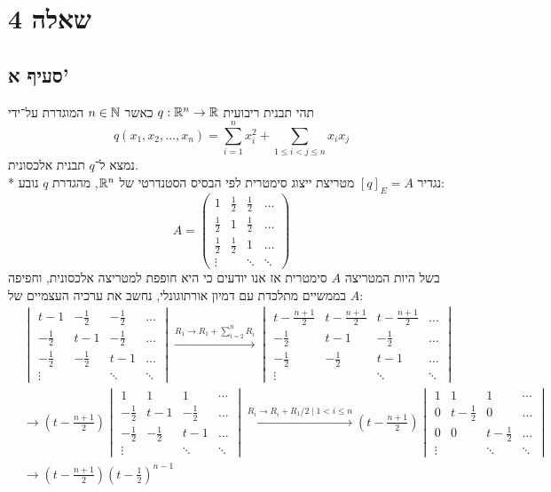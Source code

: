 \section{שאלה 4}
\subsection{סעיף א'}
תהי תבנית ריבועית $q: \mathbb{R}^n \to \mathbb{R}$ כאשר $n \in \mathbb{N}$ המוגדרת על־ידי
\[
	q(x_1, x_2, \ldots, x_n) = \sum_{i = 1}^n x_i^2 + \sum_{1 \le i < j \le n} x_i x_j
\]
נמצא ל־$q$ תבנית אלכסונית. \\*
נגדיר $[q]_E = A$ מטריצת ייצוג סימטרית לפי הבסיס הסטנדרטי של $\mathbb{R}^n$, מהגדרת $q$ נובע:
\[
	A = \begin{pmatrix}
		1  & \frac{1}{2} & \frac{1}{2} & \hdots \\
		\frac{1}{2} & 1 & \frac{1}{2} & \hdots \\
		\frac{1}{2} & \frac{1}{2} & 1 & \hdots \\
		\vdots & & \ddots & \ddots
	\end{pmatrix}
\]
בשל היות המטריצה $A$ סימטרית אז אנו יודעים כי היא חופפת למטריצה אלכסונית, וחפיפה בממשיים מתלכדת עם דמיון אורתוגונלי, נחשב את ערכיה העצמיים של $A$:
\begin{align*}
	& \begin{vmatrix}
		t - 1  & -\frac{1}{2} & -\frac{1}{2} & \hdots \\
		-\frac{1}{2} & t - 1 & -\frac{1}{2} & \hdots \\
		-\frac{1}{2} & -\frac{1}{2} & t - 1 & \hdots \\
		\vdots & & \ddots & \ddots
	\end{vmatrix}
	\xrightarrow{R_1 \to R_1 + \sum_{i = 2}^n R_i}
	\begin{vmatrix}
		t - \frac{n + 1}{2} & t - \frac{n + 1}{2} & t - \frac{n + 1}{2} & \hdots \\
		-\frac{1}{2} & t - 1 & -\frac{1}{2} & \hdots \\
		-\frac{1}{2} & -\frac{1}{2} & t - 1 & \hdots \\
		\vdots & & \ddots & \ddots
	\end{vmatrix} \\
	& \rightarrow
	\left(t - \frac{n + 1}{2}\right)
	\begin{vmatrix}
		1 & 1 & 1 & \cdots \\
		-\frac{1}{2} & t - 1 & -\frac{1}{2} & \hdots \\
		-\frac{1}{2} & -\frac{1}{2} & t - 1 & \hdots \\
		\vdots & & \ddots & \ddots
	\end{vmatrix}
	\xrightarrow{R_i \to R_i + R_1/2 \mid 1 < i \le n}
	\left(t - \frac{n + 1}{2}\right)
	\begin{vmatrix}
		1 & 1 & 1 & \cdots \\
		0 & t - \frac{1}{2} & 0 & \hdots \\
		0 & 0 & t - \frac{1}{2} & \hdots \\
		\vdots & & \ddots & \ddots
	\end{vmatrix} \\
	& \rightarrow
	\left(t - \frac{n + 1}{2}\right)
	\left(t - \frac{1}{2}\right)^{n - 1}
\end{align*}
